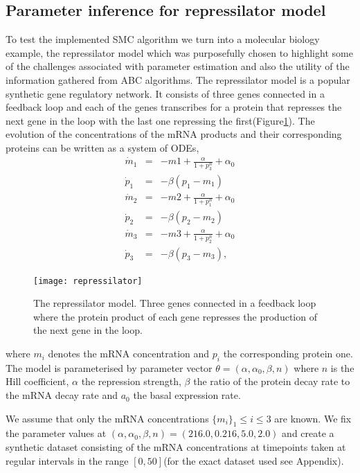 \subsection{Parameter inference for repressilator model}
To test the implemented SMC algorithm we turn into a molecular biology example, the repressilator model which was purposefully chosen to highlight some of the challenges associated with parameter estimation and also the utility of the information gathered from ABC algorithms. The repressilator model\cite[] {garcia2004modeling} is a popular synthetic gene regulatory network. It consists of three genes connected in a feedback loop and each of the genes transcribes for a protein that represses the next gene in the loop with the last one repressing the first(Figure\ref{fig:repressilator}). The evolution of the concentrations of the mRNA products and their corresponding proteins can be written as a system of ODEs,
\begin{equation}
\begin{array}{lcl}
\dot m_1 & = & -m1 + \frac{\alpha}{1 + p_{3}^{n}} + \alpha_0 \\
\dot p_1& = & -\beta(p_1 - m_1) \\
\dot m_2 & = & -m2 + \frac{\alpha}{1 + p_{1}^{n}} + \alpha_0 \\
\dot p_2 & = & -\beta(p_2 - m_2)\\
\dot m_3 & = & -m3 + \frac{\alpha}{1 + p_{2}^{n}} + \alpha_0 \\
\dot p_3 & = & -\beta(p_3 - m_3),
\end{array}
\end{equation} 
\begin{figure}
\centering
\texttt{[image: repressilator]}
\caption{The repressilator model. Three genes connected in a feedback loop where the protein product of each gene represses the production of the next gene in the loop.}
\label{fig:repressilator}
\end{figure}
where $m_i$ denotes the mRNA concentration and $p_i$ the corresponding protein one.  The model is parameterised by parameter vector $\theta = (\alpha, \alpha_0, \beta, n)$ where $n$ is the Hill coefficient, $\alpha$ the repression strength, $\beta$ the ratio of the protein decay rate to the mRNA decay rate and $a_0$ the basal expression rate. 

We assume that only the mRNA concentrations $\{m_i\}_1 \le i \le 3$ are known. We fix the parameter values at $(\alpha, \alpha_0, \beta, n) = (216.0, 0.216, 5.0, 2.0)$ and create a synthetic dataset consisting of the mRNA concentrations at timepoints taken at regular intervals in the range $[0, 50]$(for the exact dataset used see Appendix).

